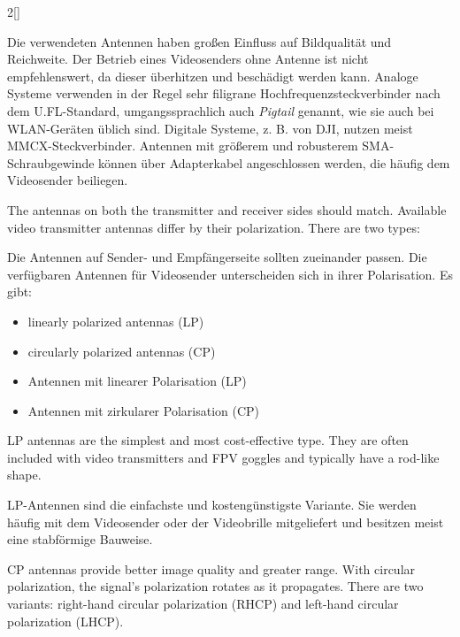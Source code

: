 \begin{paracol}{2}[]
\colger

Die verwendeten Antennen haben großen Einfluss auf Bildqualität und Reichweite. Der Betrieb eines Videosenders ohne Antenne ist nicht empfehlenswert, da dieser überhitzen und beschädigt werden kann. Analoge Systeme verwenden in der Regel sehr filigrane Hochfrequenzsteckverbinder nach dem U.FL-Standard, umgangssprachlich auch \textsl{Pigtail} genannt, wie sie auch bei WLAN-Geräten üblich sind. Digitale Systeme, z. B. von DJI, nutzen meist MMCX-Steckverbinder. Antennen mit größerem und robusterem SMA-Schraubgewinde können über Adapterkabel angeschlossen werden, die häufig dem Videosender beiliegen.

\coleng

The antennas on both the transmitter and receiver sides should match. Available video transmitter antennas differ by their polarization. There are two types:

\colger

Die Antennen auf Sender- und Empfängerseite sollten zueinander passen. Die verfügbaren Antennen für Videosender unterscheiden sich in ihrer Polarisation. Es gibt:

\coleng

\begin{itemize}
\item linearly polarized antennas (LP)
\item circularly polarized antennas (CP)
\end{itemize}

\colger

\begin{itemize}
\item Antennen mit linearer Polarisation (LP)
\item Antennen mit zirkularer Polarisation (CP)
\end{itemize}

\coleng

LP antennas are the simplest and most cost-effective type. They are often included with video transmitters and FPV goggles and typically have a rod-like shape.

\colger

LP-Antennen sind die einfachste und kostengünstigste Variante. Sie werden häufig mit dem Videosender oder der Videobrille mitgeliefert und besitzen meist eine stabförmige Bauweise.

\coleng

CP antennas provide better image quality and greater range. With circular polarization, the signal’s polarization rotates as it propagates. There are two variants: right-hand circular polarization (RHCP) and left-hand circular polarization (LHCP).


\end{paracol}
